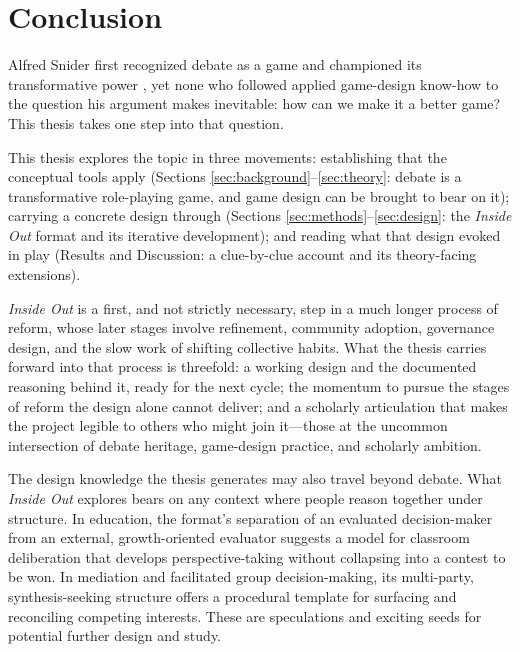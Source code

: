 \section{Conclusion}

Alfred Snider first recognized debate as a game and championed its transformative power \parencite{snider1982gaming,snider1984gaming}, yet none who followed applied game-design know-how to the question his argument makes inevitable: how can we make it a better game? This thesis takes one step into that question.

This thesis explores the topic in three movements: establishing that the conceptual tools apply (Sections \ref{sec:background}--\ref{sec:theory}: debate is a transformative role-playing game, and game design can be brought to bear on it); carrying a concrete design through (Sections \ref{sec:methods}--\ref{sec:design}: the \emph{Inside Out} format and its iterative development); and reading what that design evoked in play (Results and Discussion: a clue-by-clue account and its theory-facing extensions).

\emph{Inside Out} is a first, and not strictly necessary, step in a much longer process of reform, whose later stages involve refinement, community adoption, governance design, and the slow work of shifting collective habits. What the thesis carries forward into that process is threefold: a working design and the documented reasoning behind it, ready for the next cycle; the momentum to pursue the stages of reform the design alone cannot deliver; and a scholarly articulation that makes the project legible to others who might join it---those at the uncommon intersection of debate heritage, game-design practice, and scholarly ambition.

The design knowledge the thesis generates may also travel beyond debate. What \emph{Inside Out} explores bears on any context where people reason together under structure. In education, the format's separation of an evaluated decision-maker from an external, growth-oriented evaluator suggests a model for classroom deliberation that develops perspective-taking without collapsing into a contest to be won. In mediation and facilitated group decision-making, its multi-party, synthesis-seeking structure offers a procedural template for surfacing and reconciling competing interests. These are speculations and exciting seeds for potential further design and study.

